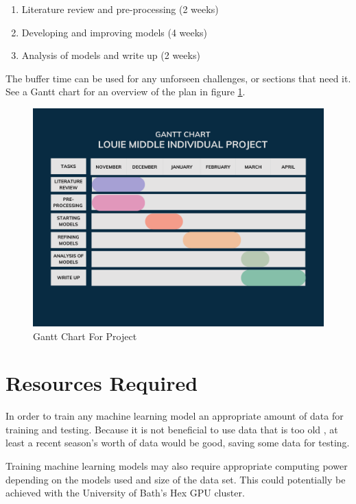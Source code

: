\documentclass[12pt,a4paper]{report}
\theoremstyle{definition}
\begin{document}
\begin{enumerate}
    \item Literature review and pre-processing (2 weeks)
    \item Developing and improving models (4 weeks)
    \item Analysis of models and write up (2 weeks)
\end{enumerate}

The buffer time can be used for any unforseen challenges, or sections that need it. 
See a Gantt chart for an overview of the plan in figure \ref{fig:gantt_chart}.

\begin{figure}[H]
    \centering
    \includegraphics[width=\linewidth]{Gantt Chart.png}
    \caption{Gantt Chart For Project}
    \label{fig:gantt_chart}
\end{figure}

\section{Resources Required}

In order to train any machine learning model an appropriate amount of data for training and testing. 
Because it is not beneficial to use data that is too old \citep{horvat2020}, at least a recent season's worth of data would be good, saving some data for testing. 

Training machine learning models may also require appropriate computing power depending on the models used and size of the data set. 
This could potentially be achieved with the University of Bath's Hex GPU cluster.
\end{document}
